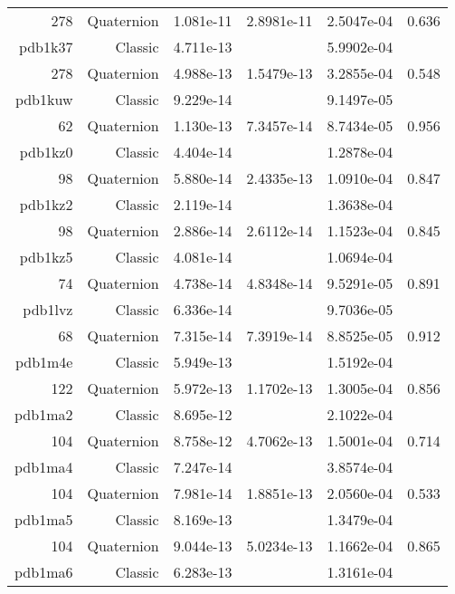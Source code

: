 \begin{xltabular}{\textwidth}{r|rS[table-format=1.3e+2]S[table-format=1.4e+2]S[table-format=1.4e+2]S[table-format=-1.3]}
278 & Quaternion & 1.081e-11 & 2.8981e-11 & 2.5047e-04 & 0.636\\  \addlinespace
{\color{red} pdb1k37 } & Classic & 4.711e-13 &  & 5.9902e-04 & \\
278 & Quaternion & 4.988e-13 & 1.5479e-13 & 3.2855e-04 & 0.548\\  \addlinespace
{\color{red} pdb1kuw } & Classic & 9.229e-14 &  & 9.1497e-05 & \\
62 & Quaternion & 1.130e-13 & 7.3457e-14 & 8.7434e-05 & 0.956\\  \addlinespace
{\color{red} pdb1kz0 } & Classic & 4.404e-14 &  & 1.2878e-04 & \\
98 & Quaternion & 5.880e-14 & 2.4335e-13 & 1.0910e-04 & 0.847\\  \addlinespace
{\color{red} pdb1kz2 } & Classic & 2.119e-14 &  & 1.3638e-04 & \\
98 & Quaternion & 2.886e-14 & 2.6112e-14 & 1.1523e-04 & 0.845\\  \addlinespace
{\color{red} pdb1kz5 } & Classic & 4.081e-14 &  & 1.0694e-04 & \\
74 & Quaternion & 4.738e-14 & 4.8348e-14 & 9.5291e-05 & 0.891\\  \addlinespace
{\color{red} pdb1lvz } & Classic & 6.336e-14 &  & 9.7036e-05 & \\
68 & Quaternion & 7.315e-14 & 7.3919e-14 & 8.8525e-05 & 0.912\\  \addlinespace
{\color{red} pdb1m4e } & Classic & 5.949e-13 &  & 1.5192e-04 & \\
122 & Quaternion & 5.972e-13 & 1.1702e-13 & 1.3005e-04 & 0.856\\  \addlinespace
{\color{red} pdb1ma2 } & Classic & 8.695e-12 &  & 2.1022e-04 & \\
104 & Quaternion & 8.758e-12 & 4.7062e-13 & 1.5001e-04 & 0.714\\  \addlinespace
{\color{red} pdb1ma4 } & Classic & 7.247e-14 &  & 3.8574e-04 & \\
104 & Quaternion & 7.981e-14 & 1.8851e-13 & 2.0560e-04 & 0.533\\  \addlinespace
{\color{red} pdb1ma5 } & Classic & 8.169e-13 &  & 1.3479e-04 & \\
104 & Quaternion & 9.044e-13 & 5.0234e-13 & 1.1662e-04 & 0.865\\  \addlinespace
{\color{red} pdb1ma6 } & Classic & 6.283e-13 &  & 1.3161e-04 & \\

\end{xltabular}
